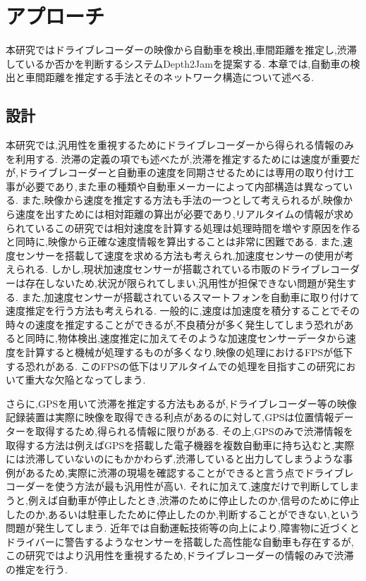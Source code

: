 
\chapter{アプローチ}
本研究ではドライブレコーダーの映像から自動車を検出,車間距離を推定し,渋滞しているか否かを判断するシステムDepth2Jamを提案する.
本章では,自動車の検出と車間距離を推定する手法とそのネットワーク構造について述べる.

\section{設計}
本研究では,汎用性を重視するためにドライブレコーダーから得られる情報のみを利用する.
渋滞の定義の項でも述べたが,渋滞を推定するためには速度が重要だが,ドライブレコーダーと自動車の速度を同期させるためには専用の取り付け工事が必要であり,また車の種類や自動車メーカーによって内部構造は異なっている.
また,映像から速度を推定する方法も手法の一つとして考えられるが,映像から速度を出すためには相対距離の算出が必要であり,リアルタイムの情報が求められているこの研究では相対速度を計算する処理は処理時間を増やす原因を作ると同時に,映像から正確な速度情報を算出することは非常に困難である.
また,速度センサーを搭載して速度を求める方法も考えられ,加速度センサーの使用が考えられる.
しかし,現状加速度センサーが搭載されている市販のドライブレコーダーは存在しないため,状況が限られてしまい,汎用性が担保できない問題が発生する.
また,加速度センサーが搭載されているスマートフォンを自動車に取り付けて速度推定を行う方法も考えられる.
一般的に,速度は加速度を積分することでその時々の速度を推定することができるが,不良積分が多く発生してしまう恐れがあると同時に,物体検出,速度推定に加えてそのような加速度センサーデータから速度を計算すると機械が処理するものが多くなり,映像の処理におけるFPSが低下する恐れがある.
このFPSの低下はリアルタイムでの処理を目指すこの研究において重大な欠陥となってしまう.

さらに,GPSを用いて渋滞を推定する方法もあるが,ドライブレコーダー等の映像記録装置は実際に映像を取得できる利点があるのに対して,GPSは位置情報データーを取得するため,得られる情報に限りがある.
その上,GPSのみで渋滞情報を取得する方法は例えばGPSを搭載した電子機器を複数自動車に持ち込むと,実際には渋滞していないのにもかかわらず,渋滞していると出力してしまうような事例がある\cite{create_jam}ため,実際に渋滞の現場を確認することができると言う点でドライブレコーダーを使う方法が最も汎用性が高い.
それに加えて,速度だけで判断してしまうと,例えば自動車が停止したとき,渋滞のために停止したのか,信号のために停止したのか,あるいは駐車したために停止したのか,判断することができない,という問題が発生してしまう.
近年では自動運転技術等の向上により,障害物に近づくとドライバーに警告するようなセンサーを搭載した高性能な自動車も存在するが,この研究ではより汎用性を重視するため,ドライブレコーダーの情報のみで渋滞の推定を行う.

